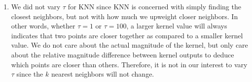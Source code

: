 \documentclass[submit]{harvardml}
\begin{document}
\begin{enumerate}
    
    \item  We did not vary $\tau$ for KNN since KNN is concerned with simply finding the closest neighbors, but not with how much we upweight closer neighbors. In other words, whether $\tau = 1$ or $\tau = 100$, a larger kernel value will always indicates that two points are closer together as compared to a smaller kernel value. We do not care about the actual magnitude of the kernel, but only care about the relative magnitude difference between kernel outputs to deduce which points are closer than others. Therefore, it is not in our interest to vary $\tau$ since the $k$ nearest neighbors will not change.

\end{enumerate}

\newpage 

\end{document}
